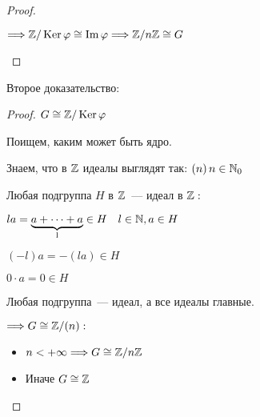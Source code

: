 \begin{theorem-non}
\begin{proof}
\begin{enumerate}
            $\Longrightarrow \mathbb{Z} / \operatorname{Ker} \varphi \cong \operatorname{Im} \varphi \Longrightarrow \mathbb{Z} / n \mathbb{Z} \cong G$
             
        \end{enumerate}
    \end{proof}

    Второе доказательство:
    \begin{proof}
        
        $G \cong \mathbb{Z} / \operatorname{Ker} \varphi$

        Поищем, каким может быть ядро.

        Знаем, что в $\mathbb{Z}$ идеалы выглядят так: $(n) \, n \in \mathbb{N}_{0}$

        Любая подгруппа $H$ в $\mathbb{Z}$~--- идеал в $\mathbb{Z}:$

        $la = \underbrace{a + \dots + a}_{\text{l}} \in H \quad l \in \mathbb{N}, a \in H$

        $(-l)a = -(la) \in H$

        $0 \cdot a = 0 \in H$

        Любая подгруппа~--- идеал, а все идеалы главные.

        $\Longrightarrow G \cong \mathbb{Z} / (n):$
        \begin{itemize}
            \item $n < +\infty \Longrightarrow G \cong \mathbb{Z} / n \mathbb{Z}$
            \item Иначе $G \cong \mathbb{Z}$
        \end{itemize}
    \end{proof}
\end{theorem-non}